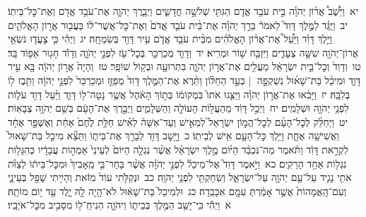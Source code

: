 \documentclass[18pt]{article}
\newcommand{\kri}[1]{\Afootnote{#1}}	%
\begin{document}
 {\loc יא~}וַיֵּ֩שֶׁב֩ אֲר֨וֹן יְהֹוָ֜ה בֵּ֣ית עֹבֵ֥ד אֱדֹ֛ם הַגִּתִּ֖י שְׁלֹשָׁ֣ה חֳדָשִׁ֑ים וַיְבָ֧רֶךְ יְהֹוָ֛ה אֶת־עֹבֵ֥ד אֱדֹ֖ם וְאֶת־כׇּל־בֵּיתֽוֹ׃ \startlock
 {\loc יב~}וַיֻּגַּ֗ד לַמֶּ֣לֶךְ דָּוִד֮ לֵאמֹר֒ בֵּרַ֣ךְ יְהֹוָ֗ה אֶת־בֵּ֨ית עֹבֵ֤ד אֱדֹם֙ וְאֶת־כׇּל־אֲשֶׁר־ל֔וֹ בַּעֲב֖וּר אֲר֣וֹן הָאֱלֹהִ֑ים וַיֵּ֣לֶךְ דָּוִ֗ד וַיַּ֩עַל֩ אֶת־אֲר֨וֹן הָאֱלֹהִ֜ים מִבֵּ֨ית עֹבֵ֥ד אֱדֹ֛ם עִ֥יר דָּוִ֖ד בְּשִׂמְחָֽה׃ \startlock
 {\loc יג~}וַיְהִ֗י כִּ֧י צָעֲד֛וּ נֹשְׂאֵ֥י אֲרוֹן־יְהֹוָ֖ה שִׁשָּׁ֣ה צְעָדִ֑ים וַיִּזְבַּ֥ח שׁ֖וֹר וּמְרִֽיא׃ \startlock
 {\loc יד~}וְדָוִ֛ד מְכַרְכֵּ֥ר בְּכׇל־עֹ֖ז לִפְנֵ֣י יְהֹוָ֑ה וְדָוִ֕ד חָג֖וּר אֵפ֥וֹד בָּֽד׃ \startlock
 {\loc טו~}וְדָוִד֙ וְכׇל־בֵּ֣ית יִשְׂרָאֵ֔ל מַעֲלִ֖ים אֶת־אֲר֣וֹן יְהֹוָ֑ה בִּתְרוּעָ֖ה וּבְק֥וֹל שׁוֹפָֽר׃ \startlock
 {\loc טז~}וְהָיָה֙ אֲר֣וֹן יְהֹוָ֔ה בָּ֖א עִ֣יר דָּוִ֑ד וּמִיכַ֨ל בַּת־שָׁא֜וּל נִשְׁקְפָ֣ה  |  בְּעַ֣ד הַחַלּ֗וֹן וַתֵּ֨רֶא אֶת־הַמֶּ֤לֶךְ דָּוִד֙ מְפַזֵּ֤ז וּמְכַרְכֵּר֙ לִפְנֵ֣י יְהֹוָ֔ה וַתִּ֥בֶז ל֖וֹ בְּלִבָּֽהּ׃ \startlock
 {\loc יז~}וַיָּבִ֜אוּ אֶת־אֲר֣וֹן יְהֹוָ֗ה וַיַּצִּ֤גוּ אֹתוֹ֙ בִּמְקוֹמ֔וֹ בְּת֣וֹךְ הָאֹ֔הֶל אֲשֶׁ֥ר נָטָה־ל֖וֹ דָּוִ֑ד וַיַּ֨עַל דָּוִ֥ד עֹל֛וֹת לִפְנֵ֥י יְהֹוָ֖ה וּשְׁלָמִֽים׃ \startlock
 {\loc יח~}וַיְכַ֣ל דָּוִ֔ד מֵהַעֲל֥וֹת הָעוֹלָ֖ה וְהַשְּׁלָמִ֑ים וַיְבָ֣רֶךְ אֶת־הָעָ֔ם בְּשֵׁ֖ם יְהֹוָ֥ה צְבָאֽוֹת׃ \startlock
 {\loc יט~}וַיְחַלֵּ֨ק לְכׇל־הָעָ֜ם לְכׇל־הֲמ֣וֹן יִשְׂרָאֵל֮ לְמֵאִ֣ישׁ וְעַד־אִשָּׁה֒ לְאִ֗ישׁ חַלַּ֥ת לֶ֙חֶם֙ אַחַ֔ת וְאֶשְׁפָּ֣ר אֶחָ֔ד וַאֲשִׁישָׁ֖ה אֶחָ֑ת וַיֵּ֥לֶךְ כׇּל־הָעָ֖ם אִ֥ישׁ לְבֵיתֽוֹ׃ \startlock
 {\loc כ~}וַיָּ֥שׇׁב דָּוִ֖ד לְבָרֵ֣ךְ אֶת־בֵּית֑וֹ \edtext{{ס}    }{\kri{פסקא באמצע פסוק}שמואל ב ו כ} וַתֵּצֵ֞א מִיכַ֤ל בַּת־שָׁאוּל֙ לִקְרַ֣את דָּוִ֔ד וַתֹּ֗אמֶר מַה־נִּכְבַּ֨ד הַיּ֜וֹם מֶ֣לֶךְ יִשְׂרָאֵ֗ל אֲשֶׁ֨ר נִגְלָ֤ה הַיּוֹם֙ לְעֵינֵי֙ אַמְה֣וֹת עֲבָדָ֔יו כְּהִגָּל֥וֹת נִגְל֖וֹת אַחַ֥ד הָרֵקִֽים׃ \startlock
 {\loc כא~}וַיֹּ֣אמֶר דָּוִד֮ אֶל־מִיכַל֒ לִפְנֵ֣י יְהֹוָ֗ה אֲשֶׁ֨ר בָּחַר־בִּ֤י מֵֽאָבִיךְ֙ וּמִכׇּל־בֵּית֔וֹ לְצַוֺּ֨ת אֹתִ֥י נָגִ֛יד עַל־עַ֥ם יְהֹוָ֖ה עַל־יִשְׂרָאֵ֑ל וְשִׂחַקְתִּ֖י לִפְנֵ֥י יְהֹוָֽה׃ \startlock
 {\loc כב~}וּנְקַלֹּ֤תִי עוֹד֙ מִזֹּ֔את וְהָיִ֥יתִי שָׁפָ֖ל בְּעֵינָ֑י וְעִם־הָֽאֲמָהוֹת֙ אֲשֶׁ֣ר אָמַ֔רְתְּ עִמָּ֖ם אִכָּבֵֽדָה׃ \startlock
 {\loc כג~}וּלְמִיכַל֙ בַּת־שָׁא֔וּל לֹא־הָ֥יָה לָ֖הּ יָ֑לֶד עַ֖ד י֥וֹם מוֹתָֽהּ׃ 
\startlock
 {\loc א~}וַיְהִ֕י כִּֽי־יָשַׁ֥ב הַמֶּ֖לֶךְ בְּבֵית֑וֹ וַיהֹוָ֛ה הֵנִיחַֽ־ל֥וֹ מִסָּבִ֖יב מִכׇּל־אֹיְבָֽיו׃ \startlock
\end{document}
